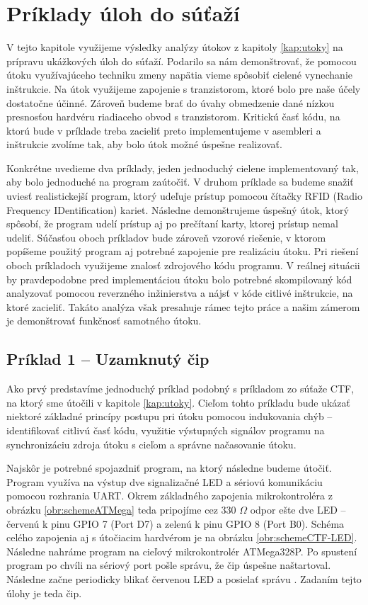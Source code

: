 \chapter{Príklady úloh do súťaží}

\label{kap:CTF}

V tejto kapitole využijeme výsledky analýzy útokov z kapitoly \ref{kap:utoky} na prípravu ukážkových úloh do súťaží. Podarilo sa nám demonštrovať, že pomocou útoku využívajúceho techniku zmeny napätia vieme spôsobiť cielené vynechanie inštrukcie. Na útok využijeme zapojenie s tranzistorom, ktoré bolo pre naše účely dostatočne účinné. Zároveň budeme brať do úvahy obmedzenie dané nízkou presnosťou hardvéru riadiaceho obvod s tranzistorom. Kritickú časť kódu, na ktorú bude v príklade treba zacieliť preto implementujeme v asembleri a inštrukcie zvolíme tak, aby bolo útok možné úspešne realizovať.

Konkrétne uvedieme dva príklady, jeden jednoduchý cielene implementovaný tak, aby bolo jednoduché na program zaútočiť. V druhom príklade sa budeme snažiť uviesť realistickejší program, ktorý udeľuje prístup pomocou čítačky RFID (Radio Frequency IDentification) kariet. Následne demonštrujeme úspešný útok, ktorý spôsobí, že program udelí prístup aj po prečítaní karty, ktorej prístup nemal udeliť. Súčasťou oboch príkladov bude zároveň vzorové riešenie, v ktorom popíšeme použitý program aj potrebné zapojenie pre realizáciu útoku. Pri riešení oboch príkladoch využijeme znalosť zdrojového kódu programu. V reálnej situácii by pravdepodobne pred implementáciou útoku bolo potrebné skompilovaný kód analyzovať pomocou reverzného inžinierstva a nájsť v kóde citlivé inštrukcie, na ktoré zacieliť. Takáto analýza však presahuje rámec tejto práce a našim zámerom je demonštrovať funkčnosť samotného útoku.

\section{Príklad 1 -- Uzamknutý čip}
Ako prvý predstavíme jednoduchý príklad podobný s príkladom zo súťaže CTF, na ktorý sme útočili v kapitole \ref{kap:utoky}. Cieľom tohto príkladu bude ukázať niektoré základné princípy postupu pri útoku pomocou indukovania chýb -- identifikovať citlivú časť kódu, využitie výstupných signálov programu na synchronizáciu zdroja útoku s cieľom a správne načasovanie útoku.

Najskôr je potrebné spojazdniť program, na ktorý následne budeme útočiť. Program využíva na výstup dve signalizačné LED a sériovú komunikáciu pomocou rozhrania UART. Okrem základného zapojenia mikrokontroléra z obrázku \ref{obr:schemeATMega} teda pripojíme cez 330 $\Omega$ odpor ešte dve LED -- červenú k pinu GPIO 7 (Port D7) a zelenú k pinu GPIO 8 (Port B0). Schéma celého zapojenia aj s útočiacim hardvérom je na obrázku \ref{obr:schemeCTF-LED}. Následne nahráme program na cieľový mikrokontrolér ATMega328P. Po spustení program po chvíli na sériový port pošle správu, že čip úspešne naštartoval. Následne začne periodicky blikať červenou LED a posielať správu . Zadaním tejto úlohy je teda  čip.

